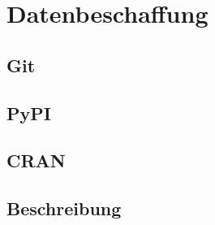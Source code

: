 \section{Datenbeschaffung}
\label{sec:datenbeschaffung}
\subsection{Git}
\label{subsec:datenbeschaffung_git}
\subsection{PyPI}
\label{subsec:datenbeschaffung_pypi}
\subsection{CRAN}
\label{subsec:datenbeschaffung_cran}
\subsection{Beschreibung}
\label{subsec:datenbeschaffung_beschreibung}
